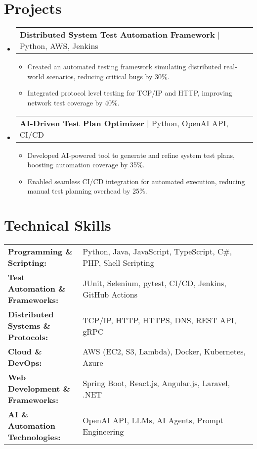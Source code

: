 \documentclass[letterpaper,11pt]{article}
\makeatletter
\newcommand{\resumeItem}[1]{
  \item\footnotesize{
    {#1 \vspace{-2pt}}
  }
}
\newcommand{\resumeProjectHeading}[2]{
    \item
    \begin{tabular*}{1.001\textwidth}{l@{\extracolsep{\fill}}r}
      \small#1 & \textbf{\small #2}\\
    \end{tabular*}\vspace{-7pt}
}
\newcommand{\resumeSubHeadingListStart}{\begin{itemize}[leftmargin=0pt, label={}]}
\newcommand{\resumeSubHeadingListEnd}{\end{itemize}}
\newcommand{\resumeItemListStart}{\begin{itemize}[leftmargin=*]}
\newcommand{\resumeItemListEnd}{\end{itemize}\vspace{-5pt}}
\makeatother
\begin{document}
\section{Projects}
    \vspace{-5pt}
    \resumeSubHeadingListStart
      \resumeProjectHeading
          {\textbf{Distributed System Test Automation Framework} | Python, AWS, Jenkins}
          {}
          \resumeItemListStart
              \resumeItem{Created an automated testing framework simulating distributed real-world scenarios, reducing critical bugs by 30\%.}
              \resumeItem{Integrated protocol level testing for TCP/IP and HTTP, improving network test coverage by 40\%.}
          \resumeItemListEnd
          \vspace{-16pt}
      \resumeProjectHeading
          {\textbf{AI-Driven Test Plan Optimizer} | Python, OpenAI API, CI/CD}
          {}
          \resumeItemListStart
              \resumeItem{Developed AI-powered tool to generate and refine system test plans, boosting automation coverage by 35\%.}
              \resumeItem{Enabled seamless CI/CD integration for automated execution, reducing manual test planning overhead by 25\%.}
          \resumeItemListEnd
    \resumeSubHeadingListEnd

\vspace{-10pt}
\section{Technical Skills}
        \vspace{-14pt}
        \begin{table}[h]
            \footnotesize
            \begin{tabular}{p{0.3\linewidth} p{0.7\linewidth}}
                \textbf{Programming \& Scripting:} & Python, Java, JavaScript, TypeScript, C\#, PHP, Shell Scripting \\
                \textbf{Test Automation \& Frameworks:} & JUnit, Selenium, pytest, CI/CD, Jenkins, GitHub Actions \\
                \textbf{Distributed Systems \& Protocols:} & TCP/IP, HTTP, HTTPS, DNS, REST API, gRPC \\
                \textbf{Cloud \& DevOps:} & AWS (EC2, S3, Lambda), Docker, Kubernetes, Azure \\
                \textbf{Web Development \& Frameworks:} & Spring Boot, React.js, Angular.js, Laravel, .NET \\
                \textbf{AI \& Automation Technologies:} & OpenAI API, LLMs, AI Agents, Prompt Engineering \\
            \end{tabular}
        \end{table}
\end{document}
